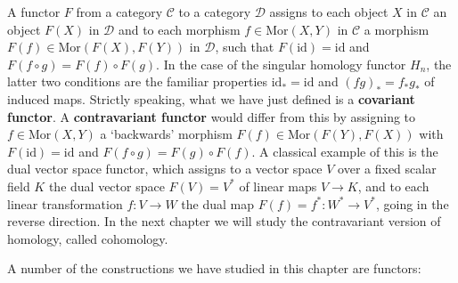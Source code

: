 A functor $F$ from a category $\mathcal{C}$ to a category $\mathcal{D}$ assigns to each object $X$ in $\mathcal{C}$ an object $F(X)$ in $\mathcal{D}$ and to each morphism $f \in \mathrm{Mor}(X,Y)$ in $\mathcal{C}$ a morphism $F(f) \in \mathrm{Mor}(F(X), F(Y))$ in $\mathcal{D}$, such that $F(\mathrm{id}) = \mathrm{id}$ and $F(f \circ g) = F(f) \circ F(g)$. In the case of the singular homology functor $H_n$, the latter two conditions are the familiar properties $\mathrm{id}_* = \mathrm{id}$ and $(fg)_* = f_* g_*$ of induced maps. Strictly speaking, what we have just defined is a \textbf{covariant functor}. A \textbf{contravariant functor} would differ from this by assigning to $f \in \mathrm{Mor}(X,Y)$ a `backwards' morphism $F(f) \in \mathrm{Mor}(F(Y), F(X))$ with $F(\mathrm{id}) = \mathrm{id}$ and $F(f \circ g) = F(g) \circ F(f)$. A classical example of this is the dual vector space functor, which assigns to a vector space $V$ over a fixed scalar field $K$ the dual vector space $F(V) = V^*$ of linear maps $V \to K$, and to each linear transformation
$f:V \to W$ the dual map $F(f) = f^*: W^* \to V^*$, going in the reverse direction. In the next chapter we will study the contravariant version of homology, called cohomology.

A number of the constructions we have studied in this chapter are functors:


